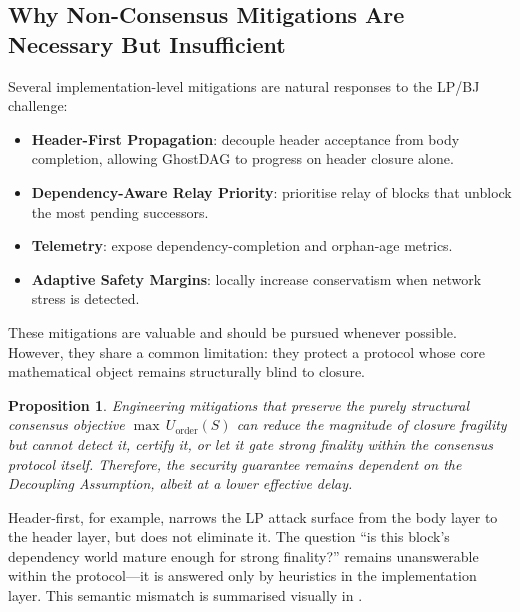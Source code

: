 \documentclass[11pt]{article}
\theoremstyle{definition}
\theoremstyle{plain}
\newtheorem{proposition}[definition]{Proposition}
\theoremstyle{remark}
\newcommand{\Uord}{U_{\mathrm{order}}}   %
\begin{document}
\subsection{Why Non-Consensus Mitigations Are Necessary But Insufficient}

Several implementation-level mitigations are natural responses to the LP/BJ
challenge:
\begin{itemize}[nosep]
    \item \textbf{Header-First Propagation}: decouple header acceptance from body
    completion, allowing GhostDAG to progress on header closure alone.
    \item \textbf{Dependency-Aware Relay Priority}: prioritise relay of blocks
    that unblock the most pending successors.
    \item \textbf{Telemetry}: expose dependency-completion and orphan-age
    metrics.
    \item \textbf{Adaptive Safety Margins}: locally increase conservatism when
    network stress is detected.
\end{itemize}

These mitigations are valuable and should be pursued whenever possible.
However, they share a common limitation: they protect a protocol whose
core mathematical object remains structurally blind to closure.

\begin{proposition}\label{prop:engineering_ceiling}
Engineering mitigations that preserve the purely structural consensus objective
$\max\,\Uord(S)$ can reduce the magnitude of closure fragility but cannot
detect it, certify it, or let it gate strong finality within the consensus
protocol itself.
Therefore, the security guarantee remains dependent on the Decoupling
Assumption, albeit at a lower effective delay.
\end{proposition}

Header-first, for example, narrows the LP attack surface from the body layer to
the header layer, but does not eliminate it.  The question ``is this block's
dependency world mature enough for strong finality?'' remains unanswerable
within the protocol---it is answered only by heuristics in the implementation
layer.
This semantic mismatch is summarised visually in .
\end{document}

